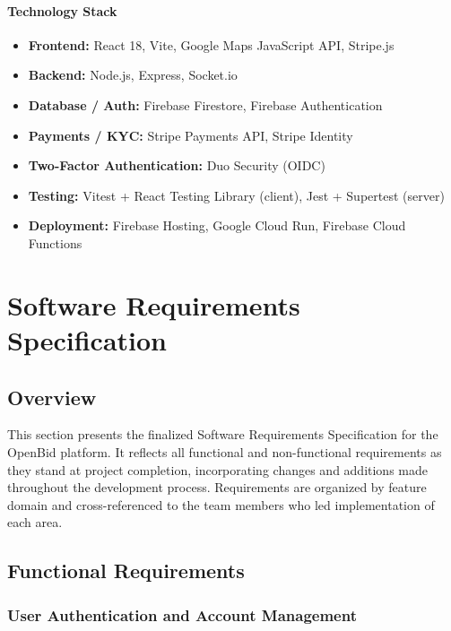 \documentclass[11pt]{article}
\begin{document}
\paragraph{Technology Stack}
\begin{itemize}[leftmargin=1.4em]
  \item \textbf{Frontend:} React 18, Vite, Google Maps JavaScript API, Stripe.js
  \item \textbf{Backend:} Node.js, Express, Socket.io
  \item \textbf{Database / Auth:} Firebase Firestore, Firebase Authentication
  \item \textbf{Payments / KYC:} Stripe Payments API, Stripe Identity
  \item \textbf{Two-Factor Authentication:} Duo Security (OIDC)
  \item \textbf{Testing:} Vitest + React Testing Library (client), Jest + Supertest (server)
  \item \textbf{Deployment:} Firebase Hosting, Google Cloud Run, Firebase Cloud Functions
\end{itemize}

\newpage

\section{Software Requirements Specification}

\subsection{Overview}
This section presents the finalized Software Requirements Specification for the OpenBid
platform. It reflects all functional and non-functional requirements as they stand at
project completion, incorporating changes and additions made throughout the development
process. Requirements are organized by feature domain and cross-referenced to the team
members who led implementation of each area.

\subsection{Functional Requirements}

\subsubsection{User Authentication and Account Management}
\end{document}
